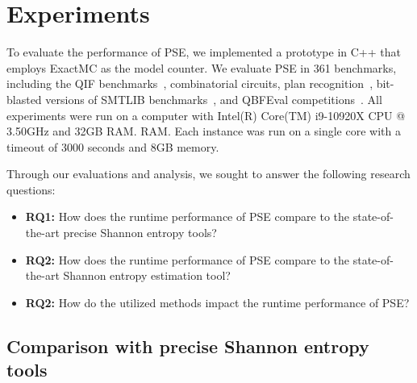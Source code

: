 \section{Experiments}
\label{sec:Experiments}

To evaluate the performance of PSE, we implemented a prototype in C++ that employs ExactMC as the model counter.
We evaluate PSE in 361 benchmarks, including the QIF  benchmarks~\cite{fremont2017maximum}, combinatorial circuits, plan recognition~\cite{soos2020tinted}, bit-blasted versions of SMTLIB benchmarks~\cite{sharma2019ganak}, and QBFEval competitions~\cite{golia2022scalable}. %
All experiments were run on a computer with Intel(R) Core(TM) i9-10920X CPU @ 3.50GHz and 32GB RAM.
RAM. 
Each instance was run on a single core with a timeout
of 3000 seconds and 8GB memory.


Through our evaluations and analysis, we sought to answer the following research questions:
\begin{itemize}
	\item \textbf{RQ1:} How does the runtime performance of PSE compare to the state-of-the-art precise Shannon entropy tools?
	\item \textbf{RQ2:} How does the runtime performance of PSE compare to the state-of-the-art Shannon entropy estimation tool?
	\item \textbf{RQ2:} How do the utilized methods impact the runtime performance of PSE? 
\end{itemize}


\subsection{Comparison with precise Shannon entropy tools}

